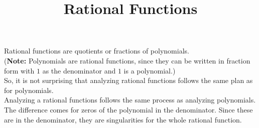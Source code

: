 \documentclass{ximera}
\title{Rational Functions}
\begin{document}
\begin{abstract}
\end{abstract}
\maketitle












Rational functions are quotients or fractions of polynomials.  \\


(\textbf{Note:} Polynomials are rational functions, since they can be written in fraction form with $1$ as the denominator and $1$ is a polynomial.)  \\


So, it is not surprising that analyzing rational functions follows the same plan as for polynomials. \\


Analyzing a rational functions follows the same process as analyzing polynomials.  The difference comes for zeros of the polynomial in the denominator.  Since these are in the denominator, they are singularities for the whole rational function.
\end{document}
